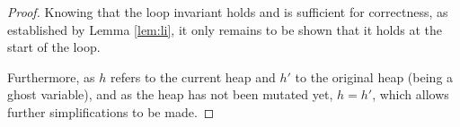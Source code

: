 \begin{proof}
  Knowing that the loop invariant holds and is sufficient for
  correctness, as established by Lemma \ref{lem:li}, it only remains
  to be shown that it holds at the start of the loop.

  \begin{prooftree}
  \end{prooftree}

  Furthermore, as $h$ refers to the current heap and $h'$ to the
  original heap (being a ghost variable), and as the heap has not been
  mutated yet, $h = h'$, which allows further simplifications to be
  made.



\end{proof}
